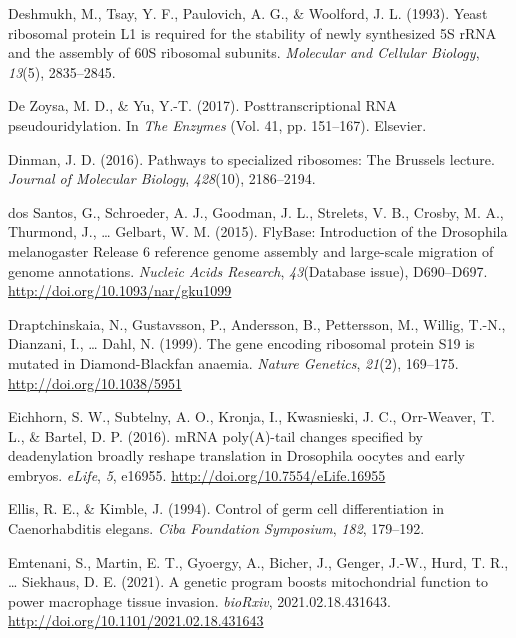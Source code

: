 \documentclass[12pt,twoside]{reedthesis}
\newlength{\cslhangindent}
\newenvironment{cslreferences}%
  {\setlength{\parindent}{0pt}%
  \everypar{\setlength{\hangindent}{\cslhangindent}}\ignorespaces}%
  {\par}
\begin{document}
\begin{cslreferences}
\leavevmode\hypertarget{ref-Deshmukh1993a}{}%
Deshmukh, M., Tsay, Y. F., Paulovich, A. G., \& Woolford, J. L. (1993). Yeast ribosomal protein L1 is required for the stability of newly synthesized 5S rRNA and the assembly of 60S ribosomal subunits. \emph{Molecular and Cellular Biology}, \emph{13}(5), 2835--2845.

\leavevmode\hypertarget{ref-DeZoysa2017}{}%
De Zoysa, M. D., \& Yu, Y.-T. (2017). Posttranscriptional RNA pseudouridylation. In \emph{The Enzymes} (Vol. 41, pp. 151--167). Elsevier.

\leavevmode\hypertarget{ref-Dinman2016a}{}%
Dinman, J. D. (2016). Pathways to specialized ribosomes: The Brussels lecture. \emph{Journal of Molecular Biology}, \emph{428}(10), 2186--2194.

\leavevmode\hypertarget{ref-dossantosFlyBaseIntroductionDrosophila2015}{}%
dos Santos, G., Schroeder, A. J., Goodman, J. L., Strelets, V. B., Crosby, M. A., Thurmond, J., \ldots{} Gelbart, W. M. (2015). FlyBase: Introduction of the Drosophila melanogaster Release 6 reference genome assembly and large-scale migration of genome annotations. \emph{Nucleic Acids Research}, \emph{43}(Database issue), D690--D697. \url{http://doi.org/10.1093/nar/gku1099}

\leavevmode\hypertarget{ref-draptchinskaiaGeneEncodingRibosomal1999}{}%
Draptchinskaia, N., Gustavsson, P., Andersson, B., Pettersson, M., Willig, T.-N., Dianzani, I., \ldots{} Dahl, N. (1999). The gene encoding ribosomal protein S19 is mutated in Diamond-Blackfan anaemia. \emph{Nature Genetics}, \emph{21}(2), 169--175. \url{http://doi.org/10.1038/5951}

\leavevmode\hypertarget{ref-Eichhorn2016n}{}%
Eichhorn, S. W., Subtelny, A. O., Kronja, I., Kwasnieski, J. C., Orr-Weaver, T. L., \& Bartel, D. P. (2016). mRNA poly(A)-tail changes specified by deadenylation broadly reshape translation in Drosophila oocytes and early embryos. \emph{eLife}, \emph{5}, e16955. \url{http://doi.org/10.7554/eLife.16955}

\leavevmode\hypertarget{ref-Ellis1994d}{}%
Ellis, R. E., \& Kimble, J. (1994). Control of germ cell differentiation in Caenorhabditis elegans. \emph{Ciba Foundation Symposium}, \emph{182}, 179--192.

\leavevmode\hypertarget{ref-emtenaniGeneticProgramBoosts2021}{}%
Emtenani, S., Martin, E. T., Gyoergy, A., Bicher, J., Genger, J.-W., Hurd, T. R., \ldots{} Siekhaus, D. E. (2021). A genetic program boosts mitochondrial function to power macrophage tissue invasion. \emph{bioRxiv}, 2021.02.18.431643. \url{http://doi.org/10.1101/2021.02.18.431643}


\end{cslreferences}
\end{document}
